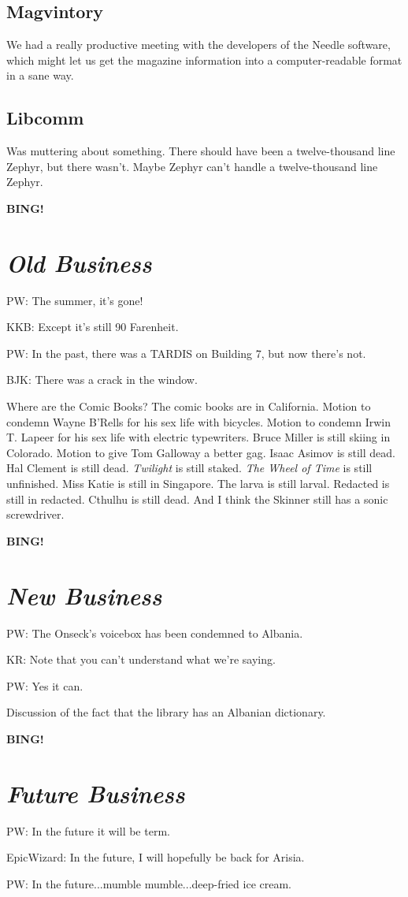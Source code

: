 \documentclass[10pt]{article}
\newcommand{\bing}{{\bf BING!} }
\newcommand{\goto}[1]{\bing \vskip 12pt \section*{{\em{#1}}}}
\begin{document}
\subsection*{Magvintory}

We had a really productive meeting with the developers of the Needle
software, which might let us get the magazine information into a
computer-readable format in a sane way.

\subsection*{Libcomm}

Was muttering about something.  There should have been a twelve-thousand
line Zephyr, but there wasn't.  Maybe Zephyr can't handle a 
twelve-thousand line Zephyr.

\goto{Old Business}

PW: The summer, it's gone!

KKB: Except it's still 90 Farenheit.

PW: In the past, there was a TARDIS on Building 7, but now there's not.

BJK: There was a crack in the window.

Where are the Comic Books? The comic books are in California. Motion to
condemn Wayne B'Rells for his sex life with bicycles. Motion to condemn
Irwin T. Lapeer for his sex life with electric typewriters. Bruce Miller
is still skiing in Colorado. Motion to give Tom Galloway a better gag.
Isaac Asimov is still dead.  Hal Clement is still dead.  \emph{Twilight}
is still staked.  \emph{The Wheel of Time} is still unfinished.  Miss
Katie is still in Singapore.  The larva is still larval.  Redacted is
still in redacted.  Cthulhu is still dead.  And I think the Skinner
still has a sonic screwdriver. 

\goto{New Business}

PW: The Onseck's voicebox has been condemned to Albania.

KR: Note that you can't understand what we're saying.

PW: Yes it can.

Discussion of the fact that the library has an Albanian dictionary.

\goto{Future Business}

PW: In the future it will be term.

EpicWizard: In the future, I will hopefully be back for Arisia.

PW: In the future...mumble mumble...deep-fried ice cream.
\end{document}
